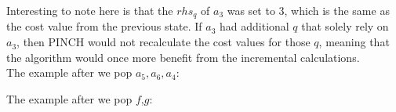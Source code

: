 Interesting to note here is that the $rhs_q$ of $a_3$ was set to 3, which is the same as the cost value from the previous state. If $a_3$ had additional $q$ that solely rely on $a_3$, then PINCH would not recalculate the cost values for those $q$, meaning that the algorithm would once more benefit from the incremental calculations.\\
The example after we pop $a_5,a_6,a_4$:
\begin{center}
\end{center}
\newpage
The example after we pop $f$,$g$:
\begin{center}
\end{center}
